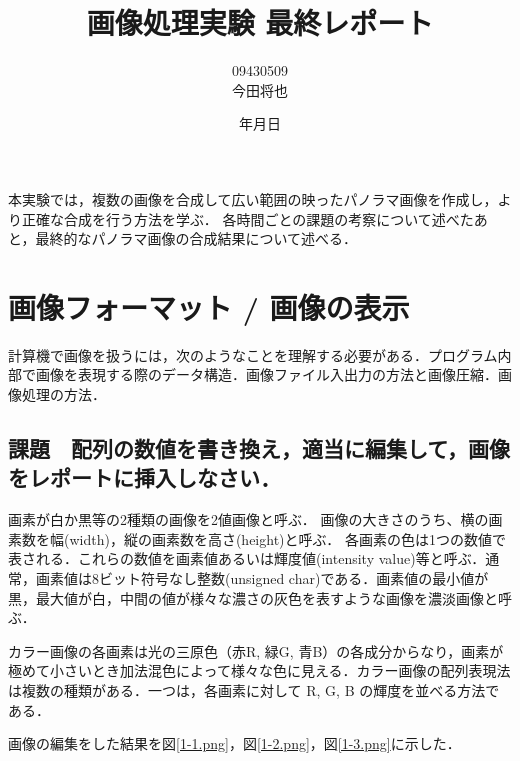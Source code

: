 \documentclass[11pt]{jarticle}
\begin{document}
\title{画像処理実験 最終レポート}
\author{09430509\\今田将也}
\date{\number\year 年\number\month 月\number\day 日}
\maketitle

本実験では，複数の画像を合成して広い範囲の映ったパノラマ画像を作成し，より正確な合成を行う方法を学ぶ．
各時間ごとの課題の考察について述べたあと，最終的なパノラマ画像の合成結果について述べる．

\section{画像フォーマット / 画像の表示}
計算機で画像を扱うには，次のようなことを理解する必要がある．プログラム内部で画像を表現する際のデータ構造．画像ファイル入出力の方法と画像圧縮．画像処理の方法．

\subsection{課題　配列の数値を書き換え，適当に編集して，画像をレポートに挿入しなさい．}
画素が白か黒等の2種類の画像を2値画像と呼ぶ．
画像の大きさのうち、横の画素数を幅(width)，縦の画素数を高さ(height)と呼ぶ．
各画素の色は1つの数値で表される．これらの数値を画素値あるいは輝度値(intensity value)等と呼ぶ．通常，画素値は8ビット符号なし整数(unsigned char)である．画素値の最小値が黒，最大値が白，中間の値が様々な濃さの灰色を表すような画像を濃淡画像と呼ぶ．

カラー画像の各画素は光の三原色（赤R, 緑G, 青B）の各成分からなり，画素が極めて小さいとき加法混色によって様々な色に見える．カラー画像の配列表現法は複数の種類がある．一つは，各画素に対して R, G, B の輝度を並べる方法である．

画像の編集をした結果を図\ref{1-1.png}，図\ref{1-2.png}，図\ref{1-3.png}に示した．
\end{document}
